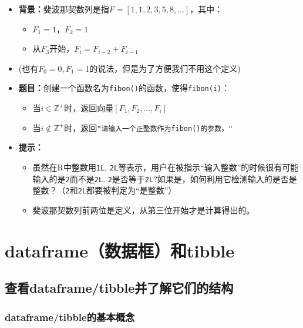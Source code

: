 \documentclass[]{book}
\providecommand{\tightlist}{%
  \setlength{\itemsep}{0pt}\setlength{\parskip}{0pt}}
\begin{document}
\begin{itemize}
\tightlist
\item
  \textbf{背景：}斐波那契数列是指\(F = [1, 1, 2, 3, 5, 8, ...]\)，其中：

  \begin{itemize}
  \tightlist
  \item
    \(F_1 = 1\)，\(F_2 = 1\)
  \item
    从\(F_3\)开始，\(F_i = F_{i-2} + F_{i-1}\)
  \end{itemize}
\item
  (也有\(F_0=0, F_1=1\)的说法，但是为了方便我们不用这个定义)
\item
  \textbf{题目：}创建一个函数名为\texttt{fibon()}的函数，使得\texttt{fibon(i)}：

  \begin{itemize}
  \tightlist
  \item
    当\(i\in \mathbb{Z}^+\)时，返回向量\([F_1, F_2, \ldots, F_i]\)
  \item
    当\(i\notin \mathbb{Z}^+\)时，返回\texttt{"请输入一个正整数作为\textasciigrave{}fibon()\textasciigrave{}的参数。"}
  \end{itemize}
\item
  \textbf{提示：}

  \begin{itemize}
  \tightlist
  \item
    虽然在R中整数用\texttt{1L}, \texttt{2L}等表示，用户在被指示``输入整数''的时候很有可能输入的是\texttt{2}而不是\texttt{2L}. \texttt{2}是否等于\texttt{2L}?如果是，如何利用它检测输入的是否是整数？（\texttt{2}和\texttt{2L}都要被判定为``是整数''）
  \item
    斐波那契数列前两位是定义，从第三位开始才是计算得出的。
  \end{itemize}
\end{itemize}

\hypertarget{tibble}{%
\chapter{dataframe（数据框）和tibble}\label{tibble}}

\hypertarget{tibble-view}{%
\section{查看dataframe/tibble并了解它们的结构}\label{tibble-view}}

\hypertarget{tibble-concept}{%
\subsection{dataframe/tibble的基本概念}\label{tibble-concept}}
\end{document}
